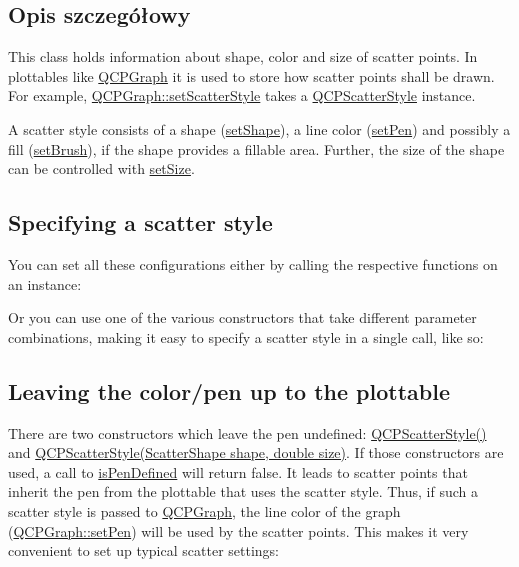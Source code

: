 \subsection{Opis szczegółowy}
This class holds information about shape, color and size of scatter points. In plottables like \hyperlink{class_q_c_p_graph}{Q\+C\+P\+Graph} it is used to store how scatter points shall be drawn. For example, \hyperlink{class_q_c_p_graph_a12bd17a8ba21983163ec5d8f42a9fea5}{Q\+C\+P\+Graph\+::set\+Scatter\+Style} takes a \hyperlink{class_q_c_p_scatter_style}{Q\+C\+P\+Scatter\+Style} instance.

A scatter style consists of a shape (\hyperlink{class_q_c_p_scatter_style_a7c641c4d4c6d29cb705d3887cfce91c1}{set\+Shape}), a line color (\hyperlink{class_q_c_p_scatter_style_a761f1f229cc0ca4703e1e2b89f6dd1ba}{set\+Pen}) and possibly a fill (\hyperlink{class_q_c_p_scatter_style_a74d692aaeb8d4b36d6f7d510e44264b1}{set\+Brush}), if the shape provides a fillable area. Further, the size of the shape can be controlled with \hyperlink{class_q_c_p_scatter_style_aaefdd031052892c4136129db68596e0f}{set\+Size}.\hypertarget{class_q_c_p_scatter_style_QCPScatterStyle-defining}{}\subsection{Specifying a scatter style}\label{class_q_c_p_scatter_style_QCPScatterStyle-defining}
You can set all these configurations either by calling the respective functions on an instance\+: 
\begin{DoxyCodeInclude}
\end{DoxyCodeInclude}
 Or you can use one of the various constructors that take different parameter combinations, making it easy to specify a scatter style in a single call, like so\+: 
\begin{DoxyCodeInclude}
\end{DoxyCodeInclude}
 \hypertarget{class_q_c_p_scatter_style_QCPScatterStyle-undefinedpen}{}\subsection{Leaving the color/pen up to the plottable}\label{class_q_c_p_scatter_style_QCPScatterStyle-undefinedpen}
There are two constructors which leave the pen undefined\+: \hyperlink{class_q_c_p_scatter_style_a8836018d9ad83ccd8870de8315c1be73}{Q\+C\+P\+Scatter\+Style()} and \hyperlink{class_q_c_p_scatter_style_a003d92f74f4561eda111862eadd62f28}{Q\+C\+P\+Scatter\+Style(\+Scatter\+Shape shape, double size)}. If those constructors are used, a call to \hyperlink{class_q_c_p_scatter_style_a7f1385a8d5e4f349a6b8030723fbd0f7}{is\+Pen\+Defined} will return false. It leads to scatter points that inherit the pen from the plottable that uses the scatter style. Thus, if such a scatter style is passed to \hyperlink{class_q_c_p_graph}{Q\+C\+P\+Graph}, the line color of the graph (\hyperlink{class_q_c_p_abstract_plottable_ab74b09ae4c0e7e13142fe4b5bf46cac7}{Q\+C\+P\+Graph\+::set\+Pen}) will be used by the scatter points. This makes it very convenient to set up typical scatter settings\+:



